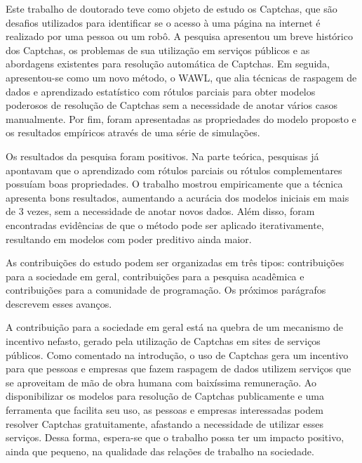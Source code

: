 \documentclass[12pt,twoside,brazilian]{book}
\begin{document}

Este trabalho de doutorado teve como objeto de estudo os Captchas, que
são desafios utilizados para identificar se o acesso à uma página na
internet é realizado por uma pessoa ou um robô. A pesquisa apresentou um
breve histórico dos Captchas, os problemas de sua utilização em serviços
públicos e as abordagens existentes para resolução automática de
Captchas. Em seguida, apresentou-se como um novo método, o WAWL, que
alia técnicas de raspagem de dados e aprendizado estatístico com rótulos
parciais para obter modelos poderosos de resolução de Captchas sem a
necessidade de anotar vários casos manualmente. Por fim, foram
apresentadas as propriedades do modelo proposto e os resultados
empíricos através de uma série de simulações.

Os resultados da pesquisa foram positivos. Na parte teórica, pesquisas
já apontavam que o aprendizado com rótulos parciais ou rótulos
complementares possuíam boas propriedades. O trabalho mostrou
empiricamente que a técnica apresenta bons resultados, aumentando a
acurácia dos modelos iniciais em mais de 3 vezes, sem a necessidade de
anotar novos dados. Além disso, foram encontradas evidências de que o
método pode ser aplicado iterativamente, resultando em modelos com poder
preditivo ainda maior.

As contribuições do estudo podem ser organizadas em três tipos:
contribuições para a sociedade em geral, contribuições para a pesquisa
acadêmica e contribuições para a comunidade de programação. Os próximos
parágrafos descrevem esses avanços.

A contribuição para a sociedade em geral está na quebra de um mecanismo
de incentivo nefasto, gerado pela utilização de Captchas em sites de
serviços públicos. Como comentado na introdução, o uso de Captchas gera
um incentivo para que pessoas e empresas que fazem raspagem de dados
utilizem serviços que se aproveitam de mão de obra humana com baixíssima
remuneração. Ao disponibilizar os modelos para resolução de Captchas
publicamente e uma ferramenta que facilita seu uso, as pessoas e
empresas interessadas podem resolver Captchas gratuitamente, afastando a
necessidade de utilizar esses serviços. Dessa forma, espera-se que o
trabalho possa ter um impacto positivo, ainda que pequeno, na qualidade
das relações de trabalho na sociedade.
\end{document}
